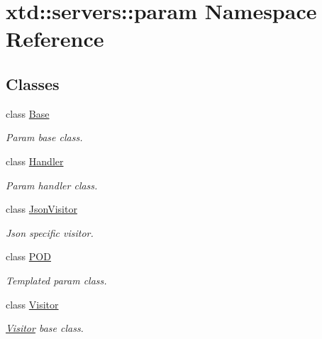 \hypertarget{namespacextd_1_1servers_1_1param}{}\section{xtd\+:\+:servers\+:\+:param Namespace Reference}
\label{namespacextd_1_1servers_1_1param}
\subsection*{Classes}
\begin{DoxyCompactItemize}
\item 
class \hyperlink{classxtd_1_1servers_1_1param_1_1Base}{Base}
\begin{DoxyCompactList}\small\item\em Param base class. \end{DoxyCompactList}\item 
class \hyperlink{classxtd_1_1servers_1_1param_1_1Handler}{Handler}
\begin{DoxyCompactList}\small\item\em Param handler class. \end{DoxyCompactList}\item 
class \hyperlink{classxtd_1_1servers_1_1param_1_1JsonVisitor}{Json\+Visitor}
\begin{DoxyCompactList}\small\item\em Json specific visitor. \end{DoxyCompactList}\item 
class \hyperlink{classxtd_1_1servers_1_1param_1_1POD}{P\+OD}
\begin{DoxyCompactList}\small\item\em Templated param class. \end{DoxyCompactList}\item 
class \hyperlink{classxtd_1_1servers_1_1param_1_1Visitor}{Visitor}
\begin{DoxyCompactList}\small\item\em \hyperlink{classxtd_1_1servers_1_1param_1_1Visitor}{Visitor} base class. \end{DoxyCompactList}\end{DoxyCompactItemize}
